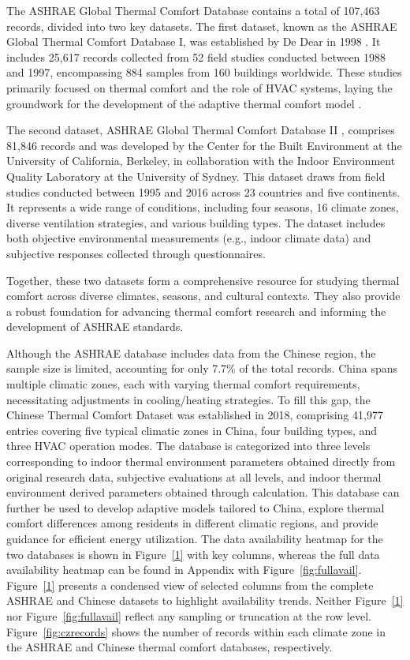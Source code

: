 \documentclass[final,3p,times,12pt]{elsarticle}
\begin{document}
The ASHRAE Global Thermal Comfort Database contains a total of 107,463 records, divided into two key datasets. The first dataset, known as the ASHRAE Global Thermal Comfort Database I, was established by De Dear in 1998 \cite{dedearGlobalDatabaseThermal}. It includes 25,617 records collected from 52 field studies conducted between 1988 and 1997, encompassing 884 samples from 160 buildings worldwide. These studies primarily focused on thermal comfort and the role of HVAC systems, laying the groundwork for the development of the adaptive thermal comfort model \cite{dedearDevelopingAdaptiveModel1998}.

The second dataset, ASHRAE Global Thermal Comfort Database II \cite{foldvarylicinaDevelopmentASHRAEGlobal2018a}, comprises 81,846 records and was developed by the Center for the Built Environment at the University of California, Berkeley, in collaboration with the Indoor Environment Quality Laboratory at the University of Sydney. This dataset draws from field studies conducted between 1995 and 2016 across 23 countries and five continents. It represents a wide range of conditions, including four seasons, 16 climate zones, diverse ventilation strategies, and various building types. The dataset includes both objective environmental measurements (e.g., indoor climate data) and subjective responses collected through questionnaires.

Together, these two datasets form a comprehensive resource for studying thermal comfort across diverse climates, seasons, and cultural contexts. They also provide a robust foundation for advancing thermal comfort research and informing the development of ASHRAE standards.

Although the ASHRAE database includes data from the Chinese region, the sample size is limited, accounting for only 7.7\% of the total records. China spans multiple climatic zones, each with varying thermal comfort requirements, necessitating adjustments in cooling/heating strategies. To fill this gap, the Chinese Thermal Comfort Dataset \cite{yangChineseThermalComfort2023} was established in 2018, comprising 41,977 entries covering five typical climatic zones in China, four building types, and three HVAC operation modes. The database is categorized into three levels corresponding to indoor thermal environment parameters obtained directly from original research data, subjective evaluations at all levels, and indoor thermal environment derived parameters obtained through calculation. This database can further be used to develop adaptive models tailored to China, explore thermal comfort differences among residents in different climatic regions, and provide guidance for efficient energy utilization. The data availability heatmap for the two databases is shown in Figure~\ref{1} with key columns, whereas the full data availability heatmap can be found in Appendix with Figure~\ref{fig:fullavail}. Figure~\ref{1} presents a condensed view of selected columns from the complete ASHRAE and Chinese datasets to highlight availability trends. Neither Figure~\ref{1} nor Figure~\ref{fig:fullavail} reflect any sampling or truncation at the row level. Figure~\ref{fig:czrecords} shows the number of records within each climate zone in the ASHRAE and Chinese thermal comfort databases, respectively.
\end{document}
